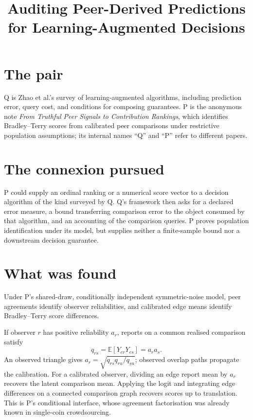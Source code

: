 \documentclass{article}
\title{Auditing Peer-Derived Predictions for Learning-Augmented Decisions}
\begin{document}
\maketitle

\section{The pair}

Q is Zhao et al.'s survey of learning-augmented algorithms, including prediction error, query cost, and conditions for composing guarantees. P is the anonymous note \emph{From Truthful Peer Signals to Contribution Rankings}, which identifies Bradley--Terry scores from calibrated peer comparisons under restrictive population assumptions; its internal names ``Q'' and ``P'' refer to different papers. 

\section{The connexion pursued}

P could supply an ordinal ranking or a numerical score vector to a decision algorithm of the kind surveyed by Q. Q's framework then asks for a declared error measure, a bound transferring comparison error to the object consumed by that algorithm, and an accounting of the comparison queries. P proves population identification under its model, but supplies neither a finite-sample bound nor a downstream decision guarantee. 

\section{What was found}

\begin{claim}
Under P's shared-draw, conditionally independent symmetric-noise model, peer agreements identify observer reliabilities, and calibrated edge means identify Bradley--Terry score differences.
\end{claim}

If observer \(r\) has positive reliability \(a_r\), reports on a common realised comparison satisfy
\[
q_{rs}=\mathbb{E}[Y_{er}Y_{es}]=a_ra_s.
\]
An observed triangle gives \(a_r=\sqrt{q_{rs}q_{ru}/q_{su}}\); observed overlap paths propagate the calibration. For a calibrated observer, dividing an edge report mean by \(a_r\) recovers the latent comparison mean. Applying the logit and integrating edge differences on a connected comparison graph recovers scores up to translation. This is P's conditional interface, whose agreement factorisation was already known in single-coin crowdsourcing. 
\end{document}

